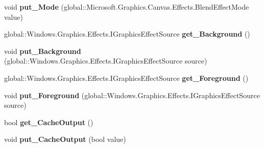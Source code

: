 \begin{DoxyCompactItemize}
\item 
\mbox{\label{class_microsoft_1_1_graphics_1_1_canvas_1_1_effects_1_1_blend_effect_ae28d797f3ec0b639d357346a4e2eb258}} 
void {\bfseries put\+\_\+\+Mode} (global\+::\+Microsoft.\+Graphics.\+Canvas.\+Effects.\+Blend\+Effect\+Mode value)
\item 
\mbox{\label{class_microsoft_1_1_graphics_1_1_canvas_1_1_effects_1_1_blend_effect_a8c5401801aebc2069ae548d01680f8a9}} 
global\+::\+Windows.\+Graphics.\+Effects.\+I\+Graphics\+Effect\+Source {\bfseries get\+\_\+\+Background} ()
\item 
\mbox{\label{class_microsoft_1_1_graphics_1_1_canvas_1_1_effects_1_1_blend_effect_abd598b6c76aa0c92ce04d0ec53ec328e}} 
void {\bfseries put\+\_\+\+Background} (global\+::\+Windows.\+Graphics.\+Effects.\+I\+Graphics\+Effect\+Source source)
\item 
\mbox{\label{class_microsoft_1_1_graphics_1_1_canvas_1_1_effects_1_1_blend_effect_a10ccecae64e09d405b1921dc72bcd69d}} 
global\+::\+Windows.\+Graphics.\+Effects.\+I\+Graphics\+Effect\+Source {\bfseries get\+\_\+\+Foreground} ()
\item 
\mbox{\label{class_microsoft_1_1_graphics_1_1_canvas_1_1_effects_1_1_blend_effect_a898a9aa44604170ad7f898b4cc45c084}} 
void {\bfseries put\+\_\+\+Foreground} (global\+::\+Windows.\+Graphics.\+Effects.\+I\+Graphics\+Effect\+Source source)
\item 
\mbox{\label{class_microsoft_1_1_graphics_1_1_canvas_1_1_effects_1_1_blend_effect_a5277510deb8dcc175e62db9fab054126}} 
bool {\bfseries get\+\_\+\+Cache\+Output} ()
\item 
\mbox{\label{class_microsoft_1_1_graphics_1_1_canvas_1_1_effects_1_1_blend_effect_abf6fc226936245b186bd77eb7281c6ed}} 
void {\bfseries put\+\_\+\+Cache\+Output} (bool value)

\end{DoxyCompactItemize}
